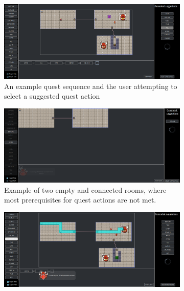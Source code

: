 \begin{figure}[t]
    \begin{subfigure}[t]{0.48\textwidth}
        \centering
         \includegraphics[width=1\textwidth]{included-papers-tex/paper-8/figures/main-sug.png}
        \caption{An example quest sequence and the user attempting to select a suggested quest action}
        \label{figs:GUI:suggestions}
    \end{subfigure}
    \begin{subfigure}[t]{0.48\textwidth}
        \centering
        \includegraphics[width=1\textwidth]{included-papers-tex/paper-8/figures/main-available-quest.png}
        \caption{Example of two empty and connected rooms, where most prerequisites for quest actions are not met.}
        \label{figs:GUI:avQuest}
    \end{subfigure} \hfill%
     \begin{subfigure}[t]{0.48\textwidth}
        \centering
        \includegraphics[width=.99\textwidth]{included-papers-tex/paper-8/figures/main-help.png}

\end{subfigure}
\end{figure}
